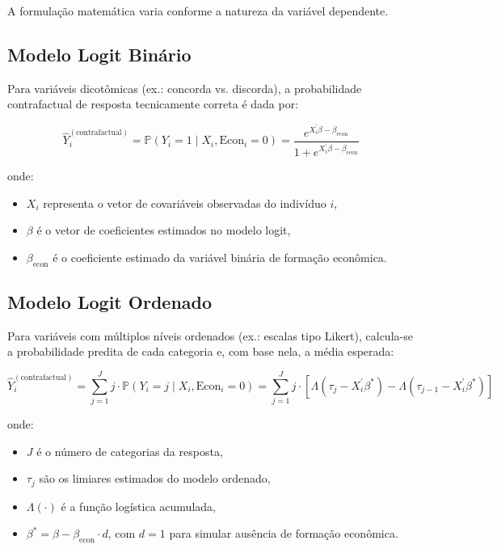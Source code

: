 A formulação matemática varia conforme a natureza da variável dependente.

\subsection{Modelo Logit Binário}

Para variáveis dicotômicas (ex.: concorda vs. discorda), a probabilidade contrafactual de resposta tecnicamente correta é dada por:

\[
\hat{Y}_i^{(\text{contrafactual})} = \mathbb{P}(Y_i = 1 \mid X_i, \text{Econ}_i = 0) = \frac{e^{X_i^\prime \beta - \beta_{\text{econ}}}}{1 + e^{X_i^\prime \beta - \beta_{\text{econ}}}}
\]

\noindent onde:
\begin{itemize}
  \item \( X_i \) representa o vetor de covariáveis observadas do indivíduo \( i \),
  \item \( \beta \) é o vetor de coeficientes estimados no modelo logit,
  \item \( \beta_{\text{econ}} \) é o coeficiente estimado da variável binária de formação econômica.
\end{itemize}

\subsection{Modelo Logit Ordenado}

Para variáveis com múltiplos níveis ordenados (ex.: escalas tipo Likert), calcula-se a probabilidade predita de cada categoria e, com base nela, a média esperada:

\[
\hat{Y}_i^{(\text{contrafactual})} = \sum_{j=1}^J j \cdot \mathbb{P}(Y_i = j \mid X_i, \text{Econ}_i = 0) = \sum_{j=1}^J j \cdot \left[ \Lambda(\tau_j - X_i^\prime \beta^*) - \Lambda(\tau_{j-1} - X_i^\prime \beta^*) \right]
\]

\noindent onde:
\begin{itemize}
  \item \( J \) é o número de categorias da resposta,
  \item \( \tau_j \) são os limiares estimados do modelo ordenado,
  \item \( \Lambda(\cdot) \) é a função logística acumulada,
  \item \( \beta^* = \beta - \beta_{\text{econ}} \cdot d \), com \( d = 1 \) para simular ausência de formação econômica.
\end{itemize}

